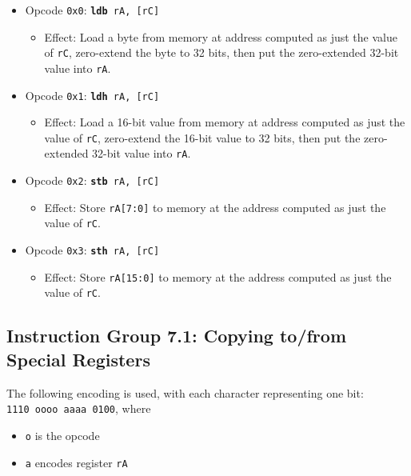 \documentclass{article}
\begin{document}
	\singlespacing
	\begin{itemize}
		\item Opcode \texttt{0x0}:
			\texttt{\textbf{ldb} rA, [rC]}
		\begin{itemize}
			\item Effect:  Load a byte from memory at address computed as
			just the value of \texttt{rC}, zero-extend the byte to 32 bits,
			then put the zero-extended 32-bit value into \texttt{rA}.
		\end{itemize}
		\item Opcode \texttt{0x1}:
			\texttt{\textbf{ldh} rA, [rC]}
		\begin{itemize}
			\item Effect:  Load a 16-bit value from memory at address
			computed as just the value of \texttt{rC}, zero-extend the
			16-bit value to 32 bits, then put the zero-extended 32-bit
			value into \texttt{rA}.
		\end{itemize}
		\item Opcode \texttt{0x2}:
			\texttt{\textbf{stb} rA, [rC]}
		\begin{itemize}
			\item Effect:  Store \texttt{rA[7:0]} to memory at the address
			computed as just the value of \texttt{rC}.
		\end{itemize}
		\item Opcode \texttt{0x3}:
			\texttt{\textbf{sth} rA, [rC]}
		\begin{itemize}
			\item Effect:  Store \texttt{rA[15:0]} to memory at the address
			computed as just the value of \texttt{rC}.
		\end{itemize}
	\end{itemize}
	\doublespacing

	\subsection{Instruction Group 7.1:  Copying to/from Special Registers}
	The following encoding is used, with each character representing one
	bit:  \\
	\texttt{1110 oooo aaaa 0100}, where

	\singlespacing
	\begin{itemize}
		\item \texttt{o} is the opcode
		\item \texttt{a} encodes register \texttt{rA}
	\end{itemize}
	\doublespacing
\end{document}
